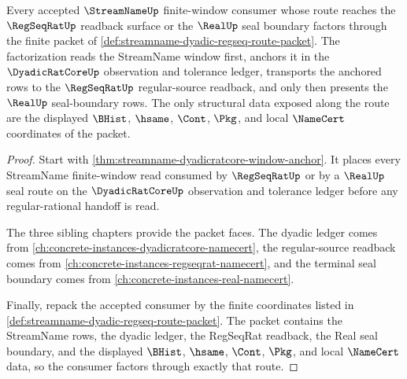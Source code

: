 \begin{theorem}
\label{thm:streamname-dyadic-regseq-route-factorization}
Every accepted $\StreamNameUp$ finite-window consumer whose route reaches the
$\RegSeqRatUp$ readback surface or the $\RealUp$ seal boundary factors through
the finite packet of
\autoref{def:streamname-dyadic-regseq-route-packet}. The factorization reads
the StreamName window first, anchors it in the $\DyadicRatCoreUp$ observation
and tolerance ledger, transports the anchored rows to the $\RegSeqRatUp$
regular-source readback, and only then presents the $\RealUp$ seal-boundary
rows. The only structural data exposed along the route are the displayed
$\BHist$, $\hsame$, $\Cont$, $\Pkg$, and local $\NameCert$ coordinates of the
packet.
\end{theorem}
\begin{proof}
Start with \autoref{thm:streamname-dyadicratcore-window-anchor}. It places
every StreamName finite-window read consumed by $\RegSeqRatUp$ or by a
$\RealUp$ seal route on the $\DyadicRatCoreUp$ observation and tolerance
ledger before any regular-rational handoff is read.

The three sibling chapters provide the packet faces. The dyadic ledger comes
from \autoref{ch:concrete-instances-dyadicratcore-namecert}, the
regular-source readback comes from
\autoref{ch:concrete-instances-regseqrat-namecert}, and the terminal seal
boundary comes from \autoref{ch:concrete-instances-real-namecert}.

Finally, repack the accepted consumer by the finite coordinates listed in
\autoref{def:streamname-dyadic-regseq-route-packet}. The packet contains the
StreamName rows, the dyadic ledger, the RegSeqRat readback, the Real seal
boundary, and the displayed $\BHist$, $\hsame$, $\Cont$, $\Pkg$, and local
$\NameCert$ data, so the consumer factors through exactly that route.
\end{proof}

